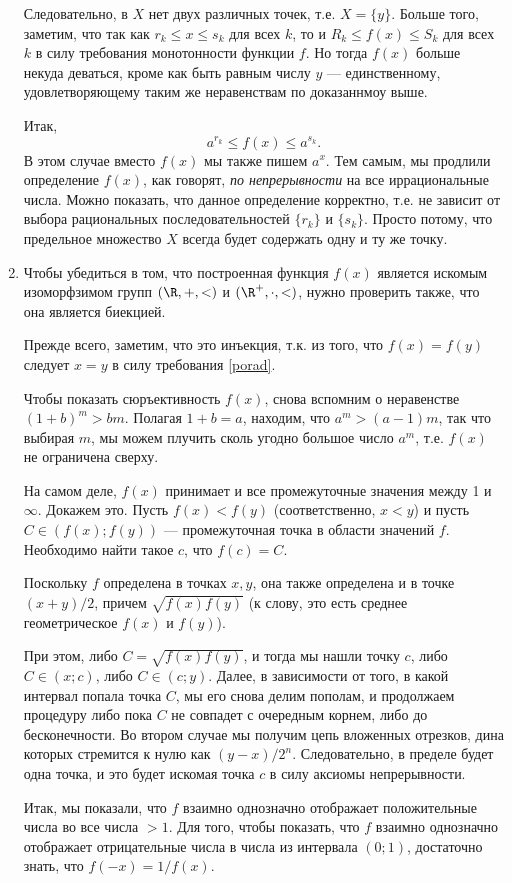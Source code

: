 \begin{enumerate}
Следовательно, в $X$ нет двух различных точек, т.е. $X=\{y\}$. Больше того, заметим, что так как $r_k\le x\le s_k$ для всех $k$, то и $R_k\le f(x)\le S_k$ для всех $k$ в силу требования монотонности функции $f$. Но тогда $f(x)$ больше некуда деваться, кроме как быть равным числу $y$ --- единственному, удовлетворяющему таким же неравенствам по доказаннмоу выше.

Итак,
$$
a^{r_k}\le f(x)\le a^{s_k}.
$$
В этом случае вместо $f(x)$ мы также пишем $a^x$. Тем самым, мы продлили определение $f(x)$, как говорят, \textit{по непрерывности} на все иррациональные числа. Можно показать, что данное определение корректно, т.е. не зависит от выбора рациональных последовательностей $\{r_k\}$ и $\{s_k\}$. Просто потому, что предельное множество $X$ всегда будет содержать одну и ту же точку.

\item Чтобы убедиться в том, что построенная функция $f(x)$ является искомым изоморфзимом групп $(\R,+,<)$ и $(\R^+,\cdot,<)$, нужно проверить также, что она является биекцией.

Прежде всего, заметим, что это инъекция, т.к. из того, что $f(x)=f(y)$ следует $x=y$ в силу требования \eqref{porad}.

Чтобы показать сюръективность $f(x)$, снова вспомним о неравенстве $(1+b)^m>bm$. Полагая $1+b=a$, находим, что $a^m>(a-1)m$, так что выбирая $m$, мы можем плучить сколь угодно большое число $a^m$, т.е. $f(x)$ не ограничена сверху.

На самом деле, $f(x)$ принимает и все промежуточные значения между 1 и $\infty$. Докажем это. Пусть $f(x)<f(y)$ (соответственно, $x<y$) и пусть $C\in(f(x);f(y))$ --- промежуточная точка в области значений $f$. Необходимо найти такое $c$, что $f(c)=C$. 

Поскольку $f$ определена в точках $x,y$, она также определена и в точке $(x+y)/2$, причем $\sqrt{f(x)f(y)}$ (к слову, это есть среднее геометрическое $f(x)$ и $f(y)$).

При этом, либо $C=\sqrt{f(x)f(y)}$, и тогда мы нашли точку $c$, либо $C\in(x;c)$, либо $C\in(c;y)$. Далее, в зависимости от того, в какой интервал попала точка $C$, мы его снова делим пополам, и продолжаем процедуру либо пока $C$ не совпадет с очередным корнем, либо до бесконечности. Во втором случае мы получим цепь вложенных отрезков, дина которых стремится к нулю как $(y-x)/2^n$. Следовательно, в пределе будет одна точка, и это будет искомая точка $c$ в силу аксиомы непрерывности.

Итак, мы показали, что $f$ взаимно однозначно отображает положительные числа во все числа $>1$. Для того, чтобы показать, что $f$ взаимно однозначно отображает отрицательные числа в числа из интервала $(0;1)$, достаточно знать, что $f(-x)=1/f(x)$.


\end{enumerate}
